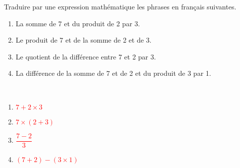 \begin{exercice}%
    Traduire par une expression mathématique les phrases en français suivantes.
    \begin{enumerate}
       \item La somme de 7 et du produit de 2 par 3.
       \item Le produit de 7 et de la somme de 2 et de 3.
       \item Le quotient de la différence entre 7 et 2 par 3.
       \item La différence de la somme de 7 et de 2 et du produit de 3 par 1.
    \end{enumerate}
 \end{exercice}
 
 \begin{corrige}
    \ \\ [-5mm]
    \begin{enumerate}
       \item \textcolor{red}{$7+2\times3$}
       \item \textcolor{red}{$7\times(2+3)$} \smallskip
       \item \textcolor{red}{$\dfrac{7-2}{3}$} \medskip
       \item \textcolor{red}{$(7+2)-(3\times1)$}
    \end{enumerate}
 \end{corrige}